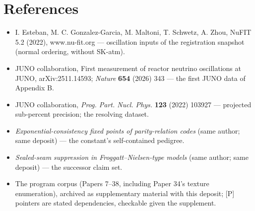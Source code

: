 \documentclass[11pt]{article}
\begin{document}
\section*{References}
\begin{itemize}
\item I. Esteban, M. C. Gonzalez-Garcia, M. Maltoni, T. Schwetz, A. Zhou, NuFIT 5.2 (2022), www.nu-fit.org — oscillation inputs of the registration snapshot (normal ordering, without SK-atm).
\item JUNO collaboration, First measurement of reactor neutrino oscillations at JUNO, arXiv:2511.14593; \emph{Nature} \textbf{654} (2026) 343 — the first JUNO data of Appendix B.
\item JUNO collaboration, \emph{Prog. Part. Nucl. Phys.} \textbf{123} (2022) 103927 — projected sub-percent precision; the resolving dataset.
\item [C0] \emph{Exponential-consistency fixed points of parity-relation codes} (same author; same deposit) — the constant's self-contained pedigree.
\item [IX] \emph{Sealed-seam suppression in Froggatt–Nielsen-type models} (same author; same deposit) — the successor claim set.
\item [P] The program corpus (Papers 7–38, including Paper 34's texture enumeration), archived as supplementary material with this deposit; [P] pointers are stated dependencies, checkable given the supplement.
\end{itemize}
\end{document}
